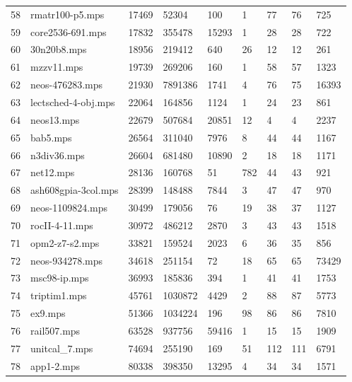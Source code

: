 \documentclass{article}
\begin{document}
\begin{longtable}{|l |l |l |l |l |l |l |l |l |}
58&rmatr100-p5.mps&17469&52304&100&1&77&76&725\\
59&core2536-691.mps&17832&355478&15293&1&28&28&722\\
60&30n20b8.mps&18956&219412&640&26&12&12&261\\
61&mzzv11.mps&19739&269206&160&1&58&57&1323\\
62&neos-476283.mps&21930&7891386&1741&4&76&75&16393\\
63&lectsched-4-obj.mps&22064&164856&1124&1&24&23&861\\
64&neos13.mps&22679&507684&20851&12&4&4&2237\\
65&bab5.mps&26564&311040&7976&8&44&44&1167\\
66&n3div36.mps&26604&681480&10890&2&18&18&1171\\
67&net12.mps&28136&160768&51&782&44&43&921\\
68&ash608gpia-3col.mps&28399&148488&7844&3&47&47&970\\
69&neos-1109824.mps&30499&179056&76&19&38&37&1127\\
70&rocII-4-11.mps&30972&486212&2870&3&43&43&1518\\
71&opm2-z7-s2.mps&33821&159524&2023&6&36&35&856\\
72&neos-934278.mps&34618&251154&72&18&65&65&73429\\
73&msc98-ip.mps&36993&185836&394&1&41&41&1753\\
74&triptim1.mps&45761&1030872&4429&2&88&87&5773\\
75&ex9.mps&51366&1034224&196&98&86&86&7810\\
76&rail507.mps&63528&937756&59416&1&15&15&1909\\
77&unitcal_7.mps&74694&255190&169&51&112&111&6791\\
78&app1-2.mps&80338&398350&13295&4&34&34&1571\\
\hline
\end{longtable}
\end{document}
